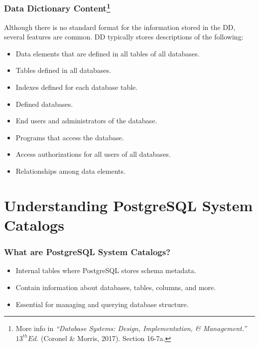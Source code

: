 \documentclass{beamer}
\begin{document}
\begin{frame}
    \frametitle{Data Dictionary Content\footnote{More info in \textit{``Database Systems: Design, Implementation, \& Management.''} $13^{th} Ed.$ (Coronel \& Morris, 2017). Section 16-7a.}}
    Although there is no standard format for the information stored in the DD, several features are common. DD typically stores descriptions of the following:
    \begin{itemize}
        \item Data elements that are defined in all tables of all databases.\pause
        \item Tables defined in all databases.\pause
        \item Indexes defined for each database table.\pause
        \item Defined databases.\pause
        \item End users and administrators of the database.\pause
        \item Programs that access the database.\pause
        \item Access authorizations for all users of all databases.\pause
        \item Relationships among data elements.\pause
    \end{itemize}
\end{frame}



\section{Understanding PostgreSQL System Catalogs}

\begin{frame}
    \frametitle{What are PostgreSQL System Catalogs?}
    \begin{itemize}
        \item Internal tables where PostgreSQL stores schema metadata.
        \item Contain information about databases, tables, columns, and more.
        \item Essential for managing and querying database structure.
    \end{itemize}
\end{frame}
\end{document}
